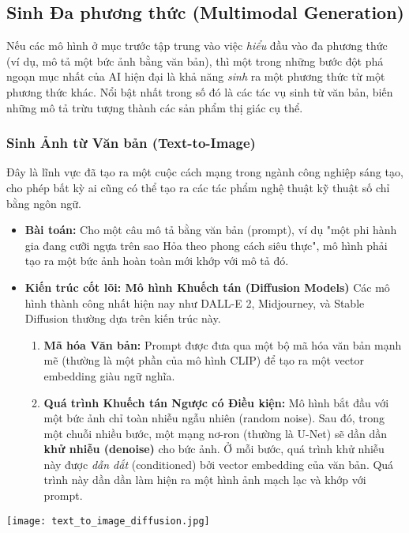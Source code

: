 \subsection{Sinh Đa phương thức (Multimodal Generation)}
\label{ssec:multimodal_generation}

Nếu các mô hình ở mục trước tập trung vào việc \textit{hiểu} đầu vào đa phương thức (ví dụ, mô tả một bức ảnh bằng văn bản), thì một trong những bước đột phá ngoạn mục nhất của AI hiện đại là khả năng \textit{sinh} ra một phương thức từ một phương thức khác. Nổi bật nhất trong số đó là các tác vụ sinh từ văn bản, biến những mô tả trừu tượng thành các sản phẩm thị giác cụ thể.

\subsubsection{Sinh Ảnh từ Văn bản (Text-to-Image)}
Đây là lĩnh vực đã tạo ra một cuộc cách mạng trong ngành công nghiệp sáng tạo, cho phép bất kỳ ai cũng có thể tạo ra các tác phẩm nghệ thuật kỹ thuật số chỉ bằng ngôn ngữ.
\begin{itemize}
    \item \textbf{Bài toán:} Cho một câu mô tả bằng văn bản (prompt), ví dụ "một phi hành gia đang cưỡi ngựa trên sao Hỏa theo phong cách siêu thực", mô hình phải tạo ra một bức ảnh hoàn toàn mới khớp với mô tả đó.
    \item \textbf{Kiến trúc cốt lõi: Mô hình Khuếch tán (Diffusion Models)} Các mô hình thành công nhất hiện nay như DALL-E 2, Midjourney, và Stable Diffusion thường dựa trên kiến trúc này.
        \begin{enumerate}
            \item \textbf{Mã hóa Văn bản:} Prompt được đưa qua một bộ mã hóa văn bản mạnh mẽ (thường là một phần của mô hình CLIP) để tạo ra một vector embedding giàu ngữ nghĩa.
            \item \textbf{Quá trình Khuếch tán Ngược có Điều kiện:} Mô hình bắt đầu với một bức ảnh chỉ toàn nhiễu ngẫu nhiên (random noise). Sau đó, trong một chuỗi nhiều bước, một mạng nơ-ron (thường là U-Net) sẽ dần dần \textbf{khử nhiễu (denoise)} cho bức ảnh. Ở mỗi bước, quá trình khử nhiễu này được \textit{dẫn dắt} (conditioned) bởi vector embedding của văn bản. Quá trình này dần dần làm hiện ra một hình ảnh mạch lạc và khớp với prompt.
        \end{enumerate}
\end{itemize}
\begin{center}
    \texttt{[image: text\_to\_image\_diffusion.jpg]}
    \label{fig:text_to_image_diffusion}
\end{center}

